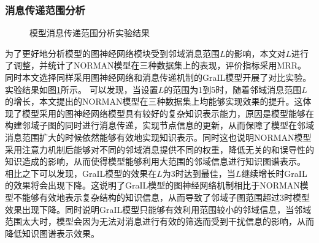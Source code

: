 \documentclass[algorithmlist, AutoFakeBold, AutoFakeSlant, figurelist, tablelist, nomlist, engineering]{seuthesix}
\begin{document}
\subsubsection{消息传递范围分析}
\begin{figure}[t]
  \centering
  \caption{模型消息传递范围分析实验结果}
  \label{Experiment1_messageRange}
\end{figure}
为了更好地分析模型的图神经网络模块受到邻域消息范围$L$的影响，本文对$L$进行了调整，并统计了NORMAN模型在三种数据集上的表现，评价指标采用MRR。
同时本文选择同样采用图神经网络和消息传递机制的GraIL模型开展了对比实验。实验结果如图\ref{Experiment1_messageRange}所示。
可以发现，当设置$L$的范围为1到5时，随着邻域消息范围$L$的增长，本文提出的NORMAN模型在三种数据集上均能够实现效果的提升。这体现了模型采用的图神经网络模型具有较好的复杂知识表示能力，原因是模型能够在构建邻域子图的同时进行消息传递，实现节点信息的更新，从而保障了模型在邻域消息范围扩大的时候依然能够有效地实现知识表示。同时这也说明NORMAN模型采用注意力机制后能够对不同的邻域消息提供不同的权重，降低无关的和误导性的知识造成的影响，从而使得模型能够利用大范围的邻域信息进行知识图谱表示。
相比之下可以发现，GraIL模型的效果在$L$为3时达到最佳，当$L$继续增长时GraIL的效果将会出现下降。这说明了GraIL模型的图神经网络机制相比于NORMAN模型不能够有效地表示复杂结构的知识信息，从而导致了邻域子图范围超过3时模型效果出现下降。同时说明GraIL模型只能够有效利用范围较小的邻域信息，当邻域范围太大时，模型会因为无法对消息进行有效的筛选而受到干扰信息的影响，从而降低知识图谱表示效果。

\end{document}
